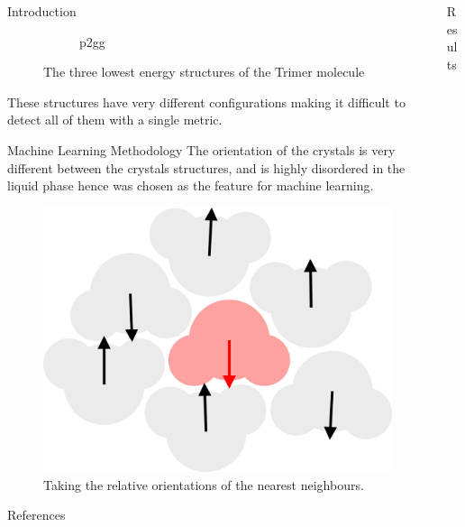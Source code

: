 \documentclass[]{beamer}
\begin{document}
\begin{frame}[t]{}
\begin{columns}[t]
\begin{column}{0.45\linewidth}
\begin{block}{Introduction}
\begin{figure}[h]
\begin{subfigure}[t]{0.3\linewidth}
            \caption{p2gg}
            \label{fig:crystals p2gg}
          \end{subfigure}
          \caption{The three lowest energy structures of the Trimer molecule}
          \label{fig:crystals}
        \end{figure}
        These structures have very different configurations making it
        difficult to detect all of them with a single metric.

      \end{block}

    \begin{block}{Machine Learning Methodology}
      The orientation of the crystals is very different between the crystals structures,
      and is highly disordered in the liquid phase hence was chosen as the feature
      for machine learning.

      \begin{figure}[h]
        \centering
        \includegraphics[width=0.8\linewidth]{orientations}
        \caption{Taking the relative orientations of the nearest neighbours.}
        \label{fig:orientations}
      \end{figure}


    \end{block}

    \begin{block}{References}

    \end{block}

    \end{column}
    \begin{column}{0.45\linewidth}
      \begin{block}{Results}


\end{block}
\end{column}
\end{columns}
\end{frame}
\end{document}
